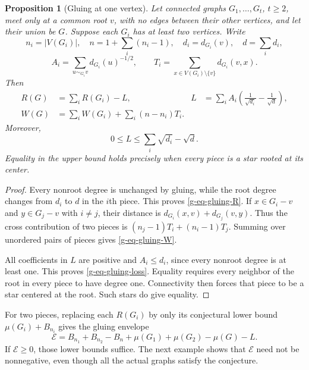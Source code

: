 \documentclass[11pt,a4paper]{article}
\newtheorem{proposition}[theorem]{Proposition}
\theoremstyle{definition}
\theoremstyle{remark}
\begin{document}
\begin{proposition}[Gluing at one vertex]
\label{g-prop-gluing}
Let connected graphs $G_1,\ldots,G_t$, $t\ge2$, meet only at a common
root $v$, with no edges between their other vertices, and let their union
be $G$.  Suppose each $G_i$ has at least two vertices.  Write
\[
 n_i=|V(G_i)|,\quad n=1+\sum_i(n_i-1),\quad
 d_i=d_{G_i}(v),\quad d=\sum_i d_i,
\]
\[
 A_i=\sum_{u\sim_{G_i}v}d_{G_i}(u)^{-1/2},\qquad
 T_i=\sum_{x\in V(G_i)\setminus\{v\}}d_{G_i}(v,x).
\]
Then
\begin{align}
 R(G)&=\sum_iR(G_i)-L,
 &L&=\sum_iA_i\left(\frac1{\sqrt{d_i}}-\frac1{\sqrt d}\right),
 \label{g-eq-gluing-R}\\
 W(G)&=\sum_iW(G_i)+\sum_i(n-n_i)T_i.
 \label{g-eq-gluing-W}
\end{align}
Moreover,
\begin{equation}
 0\le L\le\sum_i\sqrt{d_i}-\sqrt d.
 \label{g-eq-gluing-loss}
\end{equation}
Equality in the upper bound holds precisely when every piece is a star
rooted at its center.
\end{proposition}

\begin{proof}
Every nonroot degree is unchanged by gluing, while the root degree changes
from $d_i$ to $d$ in the $i$th piece.  This proves
\eqref{g-eq-gluing-R}.  If $x\in G_i-v$ and $y\in G_j-v$ with $i\ne j$,
their distance is $d_{G_i}(x,v)+d_{G_j}(v,y)$.  Thus the cross contribution
of two pieces is $(n_j-1)T_i+(n_i-1)T_j$.  Summing over unordered pairs
of pieces gives \eqref{g-eq-gluing-W}.

All coefficients in $L$ are positive and $A_i\le d_i$, since every
nonroot degree is at least one.  This proves \eqref{g-eq-gluing-loss}.
Equality requires every neighbor of the root in every piece to have
degree one.  Connectivity then forces that piece to be a star centered
at the root.  Such stars do give equality.
\end{proof}

For two pieces, replacing each $R(G_i)$ by only its conjectural lower
bound $\mu(G_i)+B_{n_i}$ gives the gluing envelope
\begin{equation}
 \mathcal E=
 B_{n_1}+B_{n_2}-B_n+\mu(G_1)+\mu(G_2)-\mu(G)-L.
 \label{g-eq-plain-envelope}
\end{equation}
If $\mathcal E\ge0$, those lower bounds suffice.  The next example shows
that $\mathcal E$ need not be nonnegative, even though all the actual
graphs satisfy the conjecture.
\end{document}
